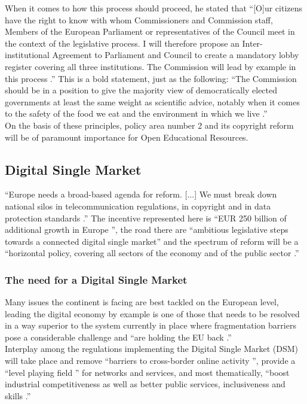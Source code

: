\documentclass[a4paper]{article}
\begin{document}
\noindent
When it comes to how this process should proceed, he stated that ``[O]ur citizens have the right to know with whom Commissioners and Commission staff, Members of the European Parliament or representatives of the Council meet in the context of the legislative process. I will therefore propose an Inter-institutional Agreement to Parliament and Council to create a mandatory lobby register covering all three institutions. The Commission will lead by example in this process \cite{JCJ}.'' This is a bold statement, just as the following: ``The Commission should be in a position to give the majority view of democratically elected governments at least the same weight as scientific advice, notably when it comes to the safety of the food we eat and the environment in which we live \cite{JCJ}.'' \\

\noindent
On the basis of these principles, policy area number 2 and its copyright reform \cite{JCJ} will be of paramount importance for Open Educational Resources.

\subsection{Digital Single Market} %

``Europe needs a broad-based agenda for reform. [...] We  must  break  down  national  silos  in telecommunication  regulations,  in  copyright  and  in  data  protection  standards \cite{JCJ}.'' The incentive represented here is ``EUR 250 billion of additional growth in Europe \cite{DSM}'', the road there are ``ambitious legislative steps towards a connected digital single market'' and the spectrum of reform will be a ``horizontal policy, covering all sectors of the economy and of the public sector \cite{DSM}.'' 

\subsubsection{The need for a Digital Single Market} 

Many issues the continent is facing are best tackled on the European level, leading the digital economy by example is one of those that needs to be resolved in a way superior to the system currently in place where fragmentation barriers pose a considerable challenge and ``are holding the EU back \cite{DSM}.'' \\

\noindent
Interplay among the regulations implementing the Digital Single Market (DSM) will take place and remove ``barriers to cross-border online activity \cite{DSM}'', provide a ``level playing field \cite{DSM}'' for networks and services, and most thematically, ``boost  industrial  competitiveness  as  well  as  better  public services, inclusiveness and skills \cite{DSM}.'' \\
\end{document}
